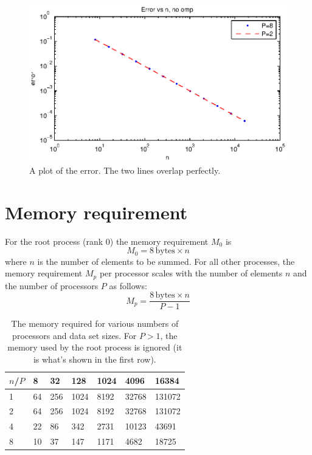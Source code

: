 \begin{figure}[htbp]
  \centering
  \includegraphics[]{graphics/error.eps}
  \caption{A plot of the error. The two lines overlap perfectly.}
  \label{fig:error}
\end{figure}


\section{Memory requirement} %
\label{sec:memory_requirement}
For the root process (rank 0) the memory requirement $M_0$ is
\begin{equation}
  M_0 = 8 \, \mathrm{bytes} \times n
\end{equation}
where $n$ is the number of elements to be summed. For all other processes, the memory requirement $M_p$ per processor scales with the number of elements $n$ and the number of processors $P$ as follows:
\begin{equation}
  M_p = \frac{8 \, \mathrm{bytes} \times n}{P-1}
\end{equation}

\begin{table}[H]
  \centering
  \caption{The memory required for various numbers of processors and data set sizes. For $P>1$, the memory used by the root process is ignored (it is what's shown in the first row).}
  \label{tab:memoryreq}
  \begin{tabularx}{1.0\textwidth}{X|XXXXXX}
    \toprule
    $n$/$P$  & 8  & 32  & 128  & 1024 & 4096  & 16384 \\
    \midrule
    1        & 64 & 256 & 1024 & 8192 & 32768 & 131072 \\
    2        & 64 & 256 & 1024 & 8192 & 32768 & 131072 \\
    4        & 22 & 86  & 342  & 2731 & 10123 & 43691  \\
    8        & 10 & 37  & 147  & 1171 & 4682  & 18725  \\
    \bottomrule
  \end{tabularx}
\end{table}

